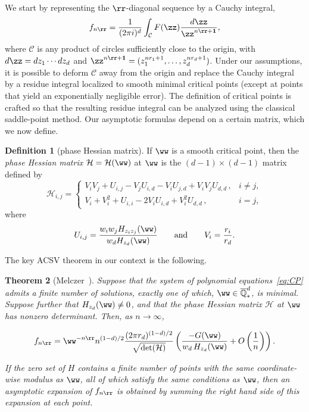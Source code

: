 \documentclass[a4paper]{amsart}
\newtheorem{theorem}{Theorem}
\theoremstyle{definition}
\newtheorem{definition}[theorem]{Definition}
\def\one{\mathbf{1}} %
\newcommand{\Q}{{\mathbb Q}}
\newcommand{\hes}{\mathcal{H}}
\begin{document}
We start by representing the $\rr$-diagonal sequence by a Cauchy integral,
\[ f_{n\rr} = \frac{1}{(2\pi i)^d} \int_{\mathcal{C}} F(\zz) \frac{d\zz}{\zz^{n\rr+\one}}, \]
where $\mathcal{C}$ is any product of circles sufficiently close to the origin, with $d\zz=dz_1\cdots dz_d$ and $\zz^{n\rr+\one}=(z_1^{nr_1+1},\ldots, z_d^{nr_d+1})$. Under our assumptions, it is possible to deform $\mathcal{C}$ away from the origin and replace the Cauchy integral by a residue integral localized to smooth minimal critical points (except at points that yield an exponentially negligible error). The definition of critical points is crafted so that the resulting residue integral can be analyzed using the classical saddle-point method. Our asymptotic formulas depend on a certain matrix, which we now define.

\begin{definition}[phase Hessian matrix] 
    If $\ww$ is a smooth critical point, then the \emph{phase Hessian matrix} $\hes=\hes(\ww)$ at $\ww$ is the $(d-1)\times(d-1)$ matrix defined by
    \begin{equation}
    \hes_{i,j} = 
    \begin{cases}
        V_iV_j + U_{i,j} - V_jU_{i,d} - V_iU_{j,d} + V_iV_jU_{d,d}\, , & i \neq j, \\[+3mm]
        V_i + V_i^2 + U_{i,i} - 2V_iU_{i,d} + V_i^2U_{d,d}\, , & i=j,
    \end{cases}
    \label{eq:hes}
    \end{equation}
    where
    \[ U_{i,j} = \frac{w_iw_j H_{z_iz_j}(\ww)}{w_dH_{z_d}(\ww)} \qquad \text{and} \qquad V_i = \frac{r_i}{r_d}.\]
\end{definition}

The key ACSV theorem in our context is the following.

\begin{theorem}[{Melczer~\cite[Theorem 5.1]{Melczer2021}}]
    \label{thm:ACSV}
    Suppose that the system of polynomial equations~\eqref{eq:CP} admits a finite number of solutions, exactly one of which, $\ww\in\overline{\Q}_*^d$, is minimal. Suppose further that $H_{z_d}(\ww)\neq0$, and that the phase Hessian matrix $\hes$ at $\ww$ has nonzero determinant. Then, as $n\rightarrow\infty$,
    
    {\small
        \[
        f_{n\rr} = \ww^{-n\rr} n^{(1-d)/2} \frac{(2\pi r_d)^{(1-d)/2}}{\sqrt{\det(\hes)}} \left(\frac{-G(\ww)}{w_d\, H_{z_d}(\ww)} + O\left(\frac{1}{n}\right)\right).
        \]
    }
    
    If the zero set of $H$ contains a finite number of points with the same coordinate-wise modulus as $\ww$, all of which satisfy the same conditions as $\ww$, then an asymptotic expansion of $f_{n\rr}$ is obtained by summing the right hand side of this expansion at each point.
\end{theorem}
\end{document}
